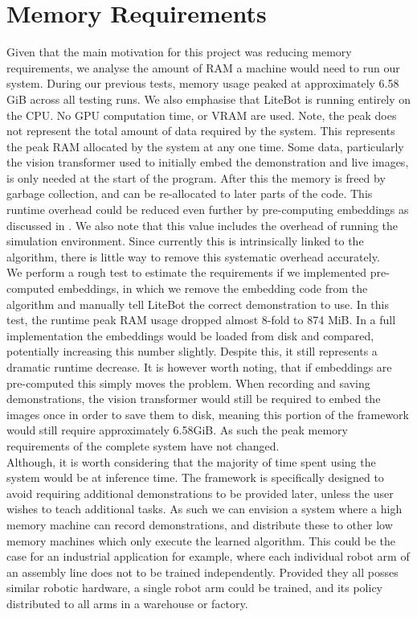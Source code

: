 \section{Memory Requirements}
Given that the main motivation for this project was reducing memory requirements, we analyse the amount of RAM a machine would need to run our system. During our previous tests, memory usage peaked at approximately 6.58 GiB across all testing runs. We also emphasise that LiteBot is running entirely on the CPU. No GPU computation time, or VRAM are used. Note, the peak does not represent the total amount of data required by the system. This represents the peak RAM allocated by the system at any one time. Some data, particularly the vision transformer used to initially embed the demonstration and live images, is only needed at the start of the program. After this the memory is freed by garbage collection, and can be re-allocated to later parts of the code. This runtime overhead could be reduced even further by pre-computing embeddings as discussed in . We also note that this value includes the overhead of running the simulation environment. Since currently this is intrinsically linked to the algorithm, there is little way to remove this systematic overhead accurately.\\

We perform a rough test to estimate the requirements if we implemented pre-computed embeddings, in which we remove the embedding code from the algorithm and manually tell LiteBot the correct demonstration to use. In this test, the runtime peak RAM usage dropped almost 8-fold to 874 MiB. In a full implementation the embeddings would be loaded from disk and compared, potentially increasing this number slightly. Despite this, it still represents a dramatic runtime decrease. It is however worth noting, that if embeddings are pre-computed this simply moves the problem. When recording and saving demonstrations, the vision transformer would still be required to embed the images once in order to save them to disk, meaning this portion of the framework would still require approximately 6.58GiB. As such the peak memory requirements of the complete system have not changed.\\

Although, it is worth considering that the majority of time spent using the system would be at inference time. The framework is specifically designed to avoid requiring additional demonstrations to be provided later, unless the user wishes to teach additional tasks. As such we can envision a system where a high memory machine can record demonstrations, and distribute these to other low memory machines which only execute the learned algorithm. This could be the case for an industrial application for example, where each individual robot arm of an assembly line does not to be trained independently. Provided they all posses similar robotic hardware, a single robot arm could be trained, and its policy distributed to all arms in a warehouse or factory.\\

